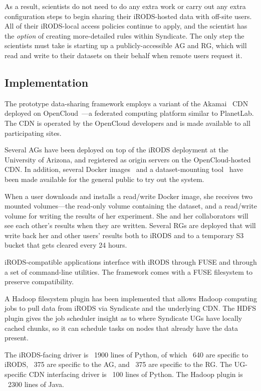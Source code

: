 As a result, scientists do not need to do any extra work or carry out any extra
configuration steps to begin sharing their iRODS-hosted data with off-site users.
All of their iRODS-local access policies continue to apply, and the scientist
has the \emph{option} of creating more-detailed rules within Syndicate.  The
only step the scientists must take is starting up a publicly-accessible AG and
RG, which will read and write to their datasets on their behalf when remote
users request it.

\subsection{Implementation}

The prototype data-sharing framework employs a variant of the
Akamai~\cite{akamai} CDN deployed on
OpenCloud~\cite{opencloud}---a federated computing platform similar to PlanetLab.
The CDN is operated by the OpenCloud developers and is made available to all
participating sites.

Several AGs have been deployed on top of the iRODS deployment at the University of
Arizona, and registered as origin servers on the OpenCloud-hosted CDN.  In
addition, several Docker images~\cite{syndicate-website} and a dataset-mounting
tool~\cite{sdm} have been made 
available for the general public to try out the system.

When a user downloads and installs a read/write Docker image, she receives two
mounted volumes---the read-only volume containing the dataset, and a read/write
volume for writing the results of her experiment.  She and her collaborators
will see each other's results when they are written.  Several RGs are deployed
that will write back her and other users' results both to iRODS and to a temporary S3
bucket that gets cleared every 24 hours.

iRODS-compatible applications interface with iRODS through FUSE and through a
set of command-line utilities.  The framework comes with a FUSE filesystem to preserve
compatibility.

A Hadoop filesystem plugin has been implemented that allows Hadoop
computing jobs to pull data from iRODS via Syndicate and the underlying CDN.
The HDFS plugin gives the job scheduler insight as to where Syndicate UGs have
locally cached chunks, so it can schedule tasks on nodes that already have the
data present.

The iRODS-facing driver is ~1900 lines of Python, of which ~640 are specific to
iRODS, ~375 are specific to the AG, and ~375 are specific to the RG.  The
UG-specific CDN interfacing driver is ~100 lines of Python.  The Hadoop plugin
is ~2300 lines of Java.

